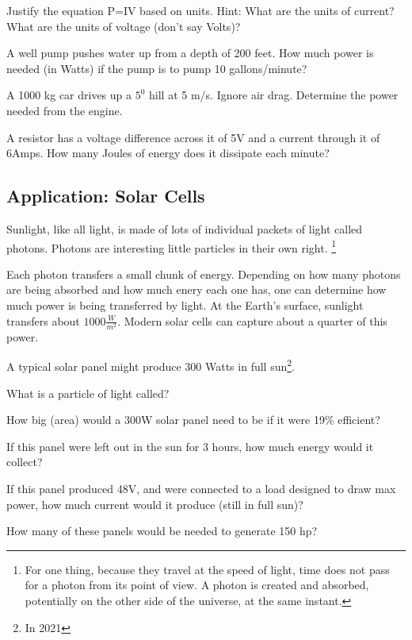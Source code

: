 \begin{blevel}
Justify the equation P=IV based on units. Hint: What are the units of current? What are the units of voltage (don't say Volts)?
\end{blevel}

\begin{clevel}
A well pump pushes water up from a depth of 200 feet. How much power is needed (in Watts) if the pump is to pump 10 gallons/minute?
\end{clevel}

\begin{clevel}
A 1000 kg car drives up a $5^0$ hill at 5 m/s. Ignore air drag. Determine the power needed from the engine.
\end{clevel}

\begin{blevel}
A resistor has a voltage difference across it of 5V and a current through it of 6Amps. How many Joules of energy does it dissipate each minute?
\end{blevel}


\subsection{Application: Solar Cells}
Sunlight, like all light, is made of lots of individual packets of light called photons. Photons are interesting little particles in their own right. \footnote{For one thing, because they travel at the speed of light, time does not pass for a photon from its point of view. A photon is created and absorbed, potentially on the other side of the universe, at the same instant.}\par

Each photon transfers a small chunk of energy. Depending on how many photons are being absorbed and how much enery each one has, one can determine how much power is being transferred by light. At the Earth's surface, sunlight transfers about $1000 \frac{W}{m^2}$. Modern solar cells can capture about a quarter of this power.

A typical solar panel might produce 300 Watts in full sun\footnote{In 2021}.

\begin{alevel}
What is a particle of light called?
\end{alevel}
\begin{blevel}
How big (area) would a 300W solar panel need to be if it were 19\% efficient?
\end{blevel}
\begin{blevel}
If this panel were left out in the sun for 3 hours, how much energy would it collect?
\end{blevel}
\begin{blevel}
If this panel produced 48V, and were connected to a load designed to draw max power, how much current would it produce (still in full sun)?
\end{blevel}
\begin{blevel}
How many of these panels would be needed to generate 150 hp?
\end{blevel}

